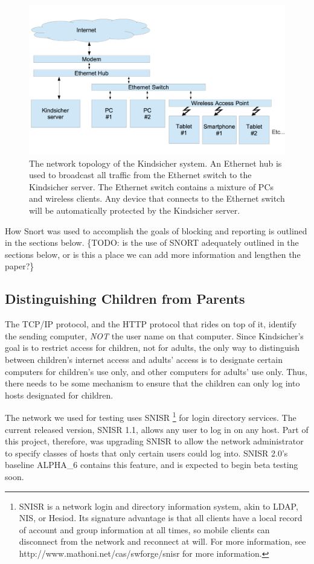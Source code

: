 \begin{figure}[!t]
    \centering
    \includegraphics[width=2\columnwidth]{figures/topology}
    \caption{The network topology of the Kindsicher system. An Ethernet hub is
        used to broadcast all traffic from the Ethernet switch to the
        Kindsicher server. The Ethernet switch contains a mixture of PCs and
        wireless clients. Any device that connects to the Ethernet switch will
        be automatically protected by the Kindsicher server.}
    \label{fig:topology}
\end{figure}

How Snort was used to accomplish the goals of blocking and reporting is outlined
in the sections below.
%
\{TODO: is the use of SNORT adequately outlined in the sections below, or is
this a place we can add more information and lengthen the paper?\}

\subsection{Distinguishing Children from Parents}

The TCP/IP protocol, and the HTTP protocol that rides on top of it, identify
the sending computer, \emph{NOT} the user name on that computer.
%
Since Kindsicher's goal is to restrict access for children, not for adults,
the only way to distinguish between children's internet access and adults'
access is to designate certain computers for children's use only, and other
computers for adults' use only.
%
Thus, there needs to be some mechanism to ensure that the children can only
log into hosts designated for children.

The network we used for testing uses SNISR
\footnote{ SNISR is a network login and directory information system, akin to
LDAP, NIS, or Hesiod.  Its signature advantage is that all clients have a
local record of account and group information at all times, so mobile clients
can disconnect from the network and reconnect at will.  For more information,
see http://www.mathoni.net/cas/swforge/snisr for more information. }
%
for login directory services.
%
The current released version, SNISR 1.1, allows any user to log in on any host.
%
Part of this project, therefore, was upgrading SNISR to allow the network
administrator to specify classes of hosts that only certain users could log
into.
%
SNISR 2.0's baseline ALPHA\_6 contains this feature, and is expected to begin
beta testing soon.


